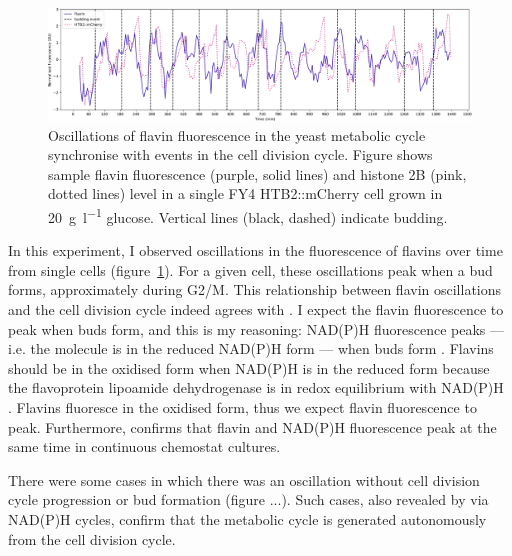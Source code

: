 \begin{figure}
  \centering
    \includegraphics[width=1.0\linewidth]{single_birth_plot_edit.pdf}
    \caption{
      Oscillations of flavin fluorescence in the yeast metabolic cycle synchronise with events in the cell division cycle.
      Figure shows sample flavin fluorescence (purple, solid lines) and histone 2B (pink, dotted lines) level in a single FY4 HTB2::mCherry cell grown in \SI{20}{\gram~\litre^{-1}} glucose.
      Vertical lines (black, dashed) indicate budding.
    }
  \label{fig:biology-highglc-single}
\end{figure}

In this experiment, I observed oscillations in the fluorescence of flavins over time from single cells (figure~\ref{fig:biology-highglc-single}).
For a given cell, these oscillations peak when a bud forms, approximately during G2/M.
This relationship between flavin oscillations and the cell division cycle indeed agrees with \textcite{baumgartnerFlavinbasedMetabolicCycles2018}.
I expect the flavin fluorescence to peak when buds form, and this is my reasoning:
NAD(P)H fluorescence peaks --- i.e. the molecule is in the reduced NAD(P)H form --- when buds form \parencite{papagiannakisAutonomousMetabolicOscillations2017}.
Flavins should be in the oxidised form when NAD(P)H is in the reduced form because the flavoprotein lipoamide dehydrogenase is in redox equilibrium with NAD(P)H \parencite{sianoNADHFlavinFluorescence1989}.
Flavins fluoresce in the oxidised form, thus we expect flavin fluorescence to peak.
Furthermore, \textcite{murrayRedoxRegulationRespiring2011} confirms that flavin and NAD(P)H fluorescence peak at the same time in continuous chemostat cultures.

There were some cases in which there was an oscillation without cell division cycle progression or bud formation (figure ...).
Such cases, also revealed by \textcite{papagiannakisAutonomousMetabolicOscillations2017} via NAD(P)H cycles, confirm that the metabolic cycle is generated autonomously from the cell division cycle.


